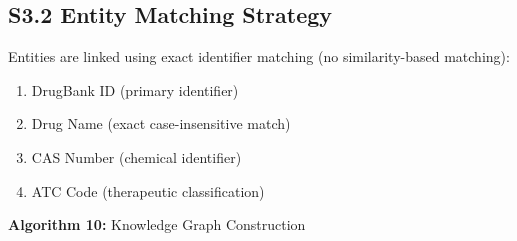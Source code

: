 \documentclass[12pt,a4paper]{article}
\begin{document}
\subsection{S3.2 Entity Matching Strategy}

Entities are linked using exact identifier matching (no similarity-based matching):
\begin{enumerate}
    \item DrugBank ID (primary identifier)
    \item Drug Name (exact case-insensitive match)
    \item CAS Number (chemical identifier)
    \item ATC Code (therapeutic classification)
\end{enumerate}

\medskip
\noindent\textbf{Algorithm 10:} Knowledge Graph Construction
\end{document}
